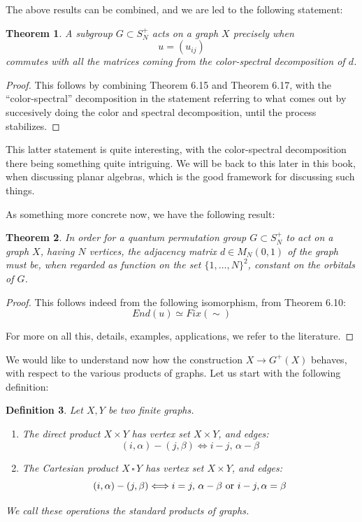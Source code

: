\documentclass[12pt]{amsbook}
\newtheorem{theorem}{Theorem}[chapter]
\newtheorem{definition}[theorem]{Definition}
\begin{document}
The above results can be combined, and we are led to the following statement:


\begin{theorem}
A subgroup $G\subset S_N^+$ acts on a graph $X$ precisely when 
$$u=(u_{ij})$$
commutes with all the matrices coming from the color-spectral decomposition of $d$.
\end{theorem}

\begin{proof}
This follows by combining Theorem 6.15 and Theorem 6.17, with the ``color-spectral'' decomposition in the statement referring to what comes out by succesively doing the color and spectral decomposition, until the process stabilizes.
\end{proof}

This latter statement is quite interesting, with the color-spectral decomposition there being something quite intriguing. We will be back to this later in this book, when discussing planar algebras, which is the good framework for discussing such things.

\bigskip

As something more concrete now, we have the following result:

\begin{theorem}
In order for a quantum permutation group $G\subset S_N^+$ to act on a graph $X$, having $N$ vertices, the adjacency matrix $d\in M_N(0,1)$ of the graph must be, when regarded as function on the set $\{1,\ldots,N\}^2$, constant on the orbitals of $G$. 
\end{theorem}

\begin{proof}
This follows indeed from the following isomorphism, from Theorem 6.10:
$$End(u)\simeq Fix(\sim)$$

For more on all this, details, examples, applications, we refer to the literature.
\end{proof}

We would like to understand now how the construction $X\to G^+(X)$ behaves, with respect to the various products of graphs. Let us start with the following definition:

\begin{definition}
Let $X,Y$ be two finite graphs.
\begin{enumerate}
\item The direct product $X\times Y$ has vertex set $X\times Y$, and edges:
$$(i,\alpha)-(j,\beta)\Longleftrightarrow i-j,\, \alpha-\beta$$

\item The Cartesian product $X\,\square\,Y$ has vertex set $X\times Y$, and edges:
$$(i,\alpha)-(j,\beta)\Longleftrightarrow i=j,\, \alpha-\beta\mbox{ \rm{or} }i-j,\alpha=\beta$$
\end{enumerate}
We call these operations the standard products of graphs.
\end{definition}
\end{document}
